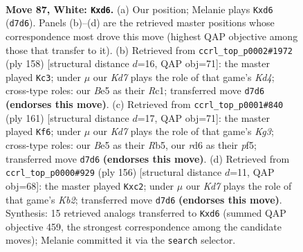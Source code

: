 \documentclass[11pt]{article}
\begin{document}
\clearpage

\begin{figure}[p]\centering
\begin{subfigure}{0.46\textwidth}\centering
\resizebox{\linewidth}{!}{%
\newchessgame
\chessboard[
  setfen={5k2/2PK4/3r4/4B3/8/8/8/8 w - - 0 87},
  showmover=false,
  pgfstyle=straightmove, color=movearrow, markmove={d7-d6}
]}
\caption{}
\end{subfigure}\hfill
\begin{subfigure}{0.46\textwidth}\centering
\resizebox{\linewidth}{!}{%
\newchessgame
\chessboard[
  setfen={8/8/3k4/3r4/3K4/p3P3/8/2R5 w - - 2 80},
  showmover=false,
  pgfstyle=straightmove, color=movearrow, markmove={d4-c3}
]}
\caption{}
\end{subfigure}
\\[4pt]
\begin{subfigure}{0.46\textwidth}\centering
\resizebox{\linewidth}{!}{%
\newchessgame
\chessboard[
  setfen={8/R7/6k1/1r3P1p/8/8/6K1/8 b - - 0 81},
  showmover=false,
  pgfstyle=straightmove, color=movearrow, markmove={g6-f6}
]}
\caption{}
\end{subfigure}\hfill
\begin{subfigure}{0.46\textwidth}\centering
\resizebox{\linewidth}{!}{%
\newchessgame
\chessboard[
  setfen={8/8/8/1k6/8/8/1KrB4/8 w - - 8 79},
  showmover=false,
  pgfstyle=straightmove, color=movearrow, markmove={b2-c2}
]}
\caption{}
\end{subfigure}
\caption{\textbf{Move 87, White: \texttt{Kxd6}.} (a) Our position; Melanie plays \texttt{Kxd6} (\texttt{d7d6}). Panels (b)--(d) are the retrieved master positions whose correspondence most drove this move (highest QAP objective among those that transfer to it). (b) Retrieved from \texttt{ccrl\_top\_p0002\#1972} (ply 158) [structural distance $d$=16, QAP obj=71]: the master played \texttt{Kc3}; under $\mu$ our \emph{Kd7} plays the role of that game's \emph{Kd4}; cross-type roles: our \emph{B}e5 as their \emph{R}c1; transferred move \texttt{d7d6} \textbf{(endorses this move)}. (c) Retrieved from \texttt{ccrl\_top\_p0001\#840} (ply 161) [structural distance $d$=17, QAP obj=71]: the master played \texttt{Kf6}; under $\mu$ our \emph{Kd7} plays the role of that game's \emph{Kg3}; cross-type roles: our \emph{B}e5 as their \emph{R}b5, our \emph{r}d6 as their \emph{p}f5; transferred move \texttt{d7d6} \textbf{(endorses this move)}. (d) Retrieved from \texttt{ccrl\_top\_p0000\#929} (ply 156) [structural distance $d$=11, QAP obj=68]: the master played \texttt{Kxc2}; under $\mu$ our \emph{Kd7} plays the role of that game's \emph{Kb2}; transferred move \texttt{d7d6} \textbf{(endorses this move)}. Synthesis: 15 retrieved analogs transferred to \texttt{Kxd6} (summed QAP objective 459, the strongest correspondence among the candidate moves); Melanie committed it via the \texttt{search} selector.}
\label{fig:thought-m172}
\end{figure}
\end{document}
